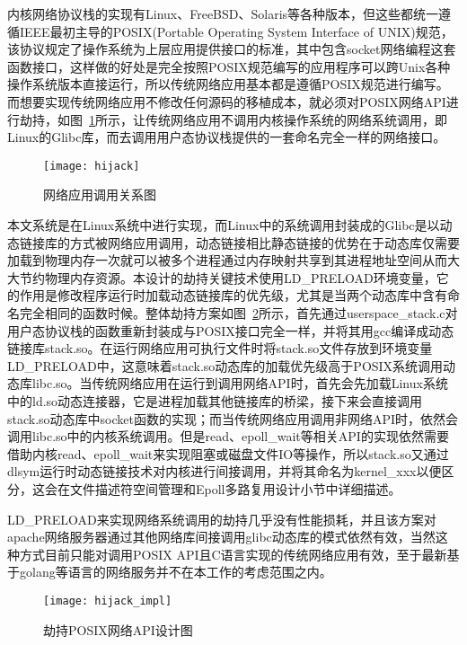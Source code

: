 内核网络协议栈的实现有Linux、FreeBSD、Solaris等各种版本，但这些都统一遵循IEEE最初主导的POSIX(Portable Operating System Interface of UNIX)规范，该协议规定了操作系统为上层应用提供接口的标准，其中包含socket网络编程这套函数接口，这样做的好处是完全按照POSIX规范编写的应用程序可以跨Unix各种操作系统版本直接运行，所以传统网络应用基本都是遵循POSIX规范进行编写。而想要实现传统网络应用不修改任何源码的移植成本，就必须对POSIX网络API进行劫持，如图~\ref{fig:hijack}所示，让传统网络应用不调用内核操作系统的网络系统调用，即Linux的Glibc库，而去调用用户态协议栈提供的一套命名完全一样的网络接口。

\vspace{-10pt}
\begin{figure}[H] %
  \centering
  \texttt{[image: hijack]}
  \caption{网络应用调用关系图}
  \label{fig:hijack}
\end{figure}
\vspace{-10pt}

本文系统是在Linux系统中进行实现，而Linux中的系统调用封装成的Glibc是以动态链接库的方式被网络应用调用，动态链接相比静态链接的优势在于动态库仅需要加载到物理内存一次就可以被多个进程通过内存映射共享到其进程地址空间从而大大节约物理内存资源。本设计的劫持关键技术使用LD\_PRELOAD环境变量，它的作用是修改程序运行时加载动态链接库的优先级，尤其是当两个动态库中含有命名完全相同的函数时候。整体劫持方案如图~\ref{fig:hijack_impl}所示，首先通过userspace\_stack.c对用户态协议栈的函数重新封装成与POSIX接口完全一样，并将其用gcc编译成动态链接库stack.so。在运行网络应用可执行文件时将stack.so文件存放到环境变量LD\_PRELOAD中，这意味着stack.so动态库的加载优先级高于POSIX系统调用动态库libc.so。当传统网络应用在运行到调用网络API时，首先会先加载Linux系统中的ld.so动态连接器，它是进程加载其他链接库的桥梁，接下来会直接调用stack.so动态库中socket函数的实现；而当传统网络应用调用非网络API时，依然会调用libc.so中的内核系统调用。但是read、epoll\_wait等相关API的实现依然需要借助内核read、epoll\_wait来实现阻塞或磁盘文件IO等操作，所以stack.so又通过dlsym运行时动态链接技术对内核进行间接调用，并将其命名为kernel\_xxx以便区分，这会在文件描述符空间管理和Epoll多路复用设计小节中详细描述。

LD\_PRELOAD来实现网络系统调用的劫持几乎没有性能损耗，并且该方案对apache网络服务器通过其他网络库间接调用glibc动态库的模式依然有效，当然这种方式目前只能对调用POSIX API且C语言实现的传统网络应用有效，至于最新基于golang等语言的网络服务并不在本工作的考虑范围之内。

\vspace{-10pt}
\begin{figure}[H] %
  \centering
  \texttt{[image: hijack\_impl]}
  \caption{劫持POSIX网络API设计图}
  \label{fig:hijack_impl}
\end{figure}
\vspace{-10pt}

